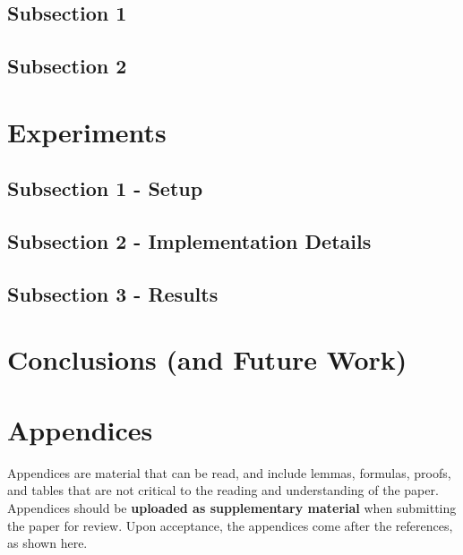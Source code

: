 \documentclass[10pt,twocolumn,letterpaper]{article}
\begin{document}
\subsection{Subsection 1}
\subsection{Subsection 2}

\section{Experiments}
\label{sec:experiments}
\subsection{Subsection 1 - Setup}
\subsection{Subsection 2 - Implementation Details}
\subsection{Subsection 3 - Results}

\section{Conclusions (and Future Work)}
\label{sec:conclusions}

\appendix
\section{Appendices}
\label{sec:appendix}
Appendices are material that can be read, and include lemmas, formulas, proofs, and tables that are not critical to the reading and understanding of the paper. 
Appendices should be \textbf{uploaded as supplementary material} when submitting the paper for review.
Upon acceptance, the appendices come after the references, as shown here.
\end{document}
